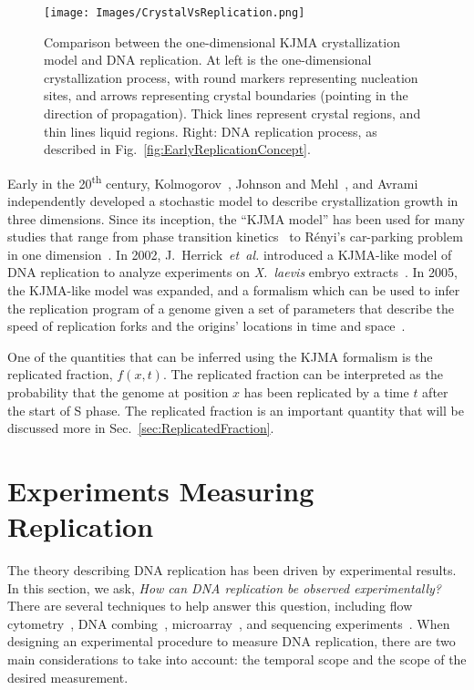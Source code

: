 	\begin{figure}[tbh]
		\begin{center}
			\texttt{[image: Images/CrystalVsReplication.png]}
		\end{center}
			\caption[Comparison Between 1-D Crystallization and DNA Replication]{\label{fig:CrystalVsReplication} Comparison between the one-dimensional KJMA crystallization model and DNA replication.
				At left is the one-dimensional crystallization process, with round markers representing nucleation sites, and arrows representing crystal boundaries (pointing in the direction of propagation).
				Thick lines represent crystal regions, and thin lines liquid regions.
				Right: DNA replication process, as described in Fig.~\ref{fig:EarlyReplicationConcept}.}
	\end{figure}
	
	Early in the 20\textsuperscript{th} century, Kolmogorov~\cite{Kolmogorov}, Johnson and Mehl~\cite{JohnsonAndMehl}, and Avrami~\cite{AvramiI,AvramiII,AvramiIII} independently developed a stochastic model to describe crystallization growth in three dimensions.
	Since its inception, the ``KJMA model'' has been used for many studies that range from phase transition kinetics~\cite{AlloyPhaseTransitions} to R{\'e}nyi's car-parking problem in one dimension~\cite{CarParking}.
	In 2002, J.~Herrick~\emph{et~al.} introduced a KJMA-like model of DNA replication to analyze experiments on \emph{X.~laevis} embryo extracts~\cite{KJMA2002}.
	In 2005, the KJMA-like model was expanded, and a formalism which can be used to infer the replication program of a genome given a set of parameters that describe the speed of replication forks and the origins' locations in time and space~\cite{KJMA1, KJMA2}.
	
	One of the quantities that can be inferred using the KJMA formalism is the replicated fraction, $f(x,t)$.
	The replicated fraction can be interpreted as the probability that the genome at position $x$ has been replicated by a time $t$ after the start of S phase.
	The replicated fraction is an important quantity that will be discussed more in Sec.~\ref{sec:ReplicatedFraction}.
	
	
	\section{Experiments Measuring Replication}
	\label{sec:ExperimentsBasics}
	
	The theory describing DNA replication has been driven by experimental results.
	In this section, we ask, \emph{How can DNA replication be observed experimentally?}
	There are several techniques to help answer this question, including flow cytometry~\cite{DeepSeq}, DNA combing~\cite{DNACombing}, microarray~\cite{MicroarrayReview, McCuneMicroArray}, and sequencing experiments~\cite{StochasticTermination,DeepSeq}.
	When designing an experimental procedure to measure DNA replication, there are two main considerations to take into account: the temporal scope and the scope of the desired measurement.
	
